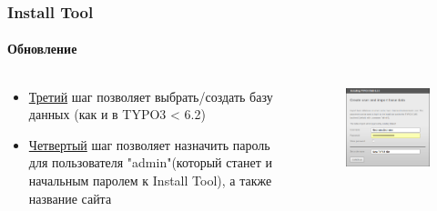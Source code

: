 
\begin{frame}[fragile]
	\frametitle{Install Tool}
	\framesubtitle{Обновление}

	\begin{columns}[T]

		\begin{column}{.5\textwidth}
			\begin{itemize}
				\item \underline{Третий} шаг позволяет выбрать/создать базу данных\newline
					(как и в TYPO3 < 6.2)
				\item \underline{Четвертый} шаг позволяет назначить пароль для пользователя "admin"\newline(который станет и начальным паролем к Install Tool), а также название сайта
			\end{itemize}
		\end{column}

		\begin{column}{.5\textwidth}
			\begin{figure}\vspace*{-0.4cm}
				\includegraphics[width=0.8\linewidth]{Images/InstallTool/AdminPasswordAndSiteName.png}
			\end{figure}
		\end{column}

	\end{columns}

\end{frame}

